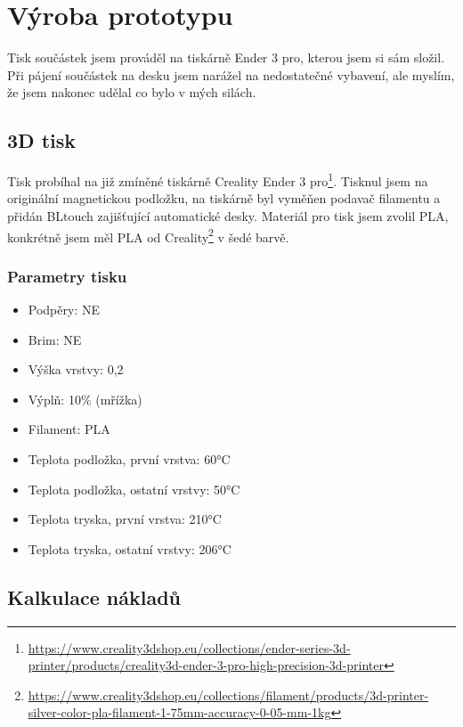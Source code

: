 \documentclass[11pt,a4paper,twoside,openright]{report}
\begin{document}
	\section{Výroba prototypu}
	
	Tisk součástek jsem prováděl na tiskárně Ender 3 pro, kterou jsem si sám složil. Při pájení součástek na desku jsem narážel na nedostatečné vybavení, ale myslím, že jsem nakonec udělal co bylo v mých silách. 
	
	\subsection{3D tisk}
	
	Tisk probíhal na již zmíněné tiskárně Creality Ender 3 pro\footnote{\url{https://www.creality3dshop.eu/collections/ender-series-3d-printer/products/creality3d-ender-3-pro-high-precision-3d-printer}}. Tisknul jsem na originální magnetickou podložku, na tiskárně byl vyměňen podavač filamentu a přidán BLtouch zajišťující automatické  desky. Materiál pro tisk jsem zvolil PLA, konkrétně jsem měl PLA od Creality\footnote{\url{https://www.creality3dshop.eu/collections/filament/products/3d-printer-silver-color-pla-filament-1-75mm-accuracy-0-05-mm-1kg}} v šedé barvě.
	
	\subsubsection{Parametry tisku}
	\begin{itemize}
		\item Podpěry: NE
		\item Brim: NE
		\item Výška vrstvy: 0,2
		\item Výplň: 10\% (mřížka)
		\item Filament: PLA
		\item Teplota podložka, první vrstva: 60°C
		\item Teplota podložka, ostatní vrstvy: 50°C
		\item Teplota tryska, první vrstva: 210°C
		\item Teplota tryska, ostatní vrstvy: 206°C
	\end{itemize}
	
	\subsection{Kalkulace nákladů}
	
\end{document}
